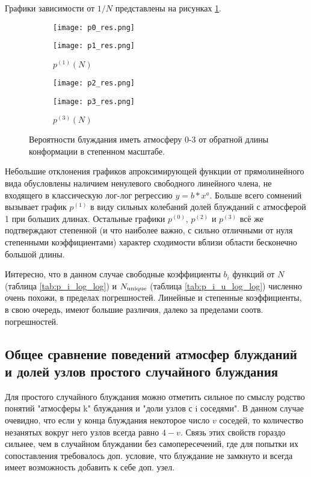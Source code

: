 Графики зависимости от $1/N$ представлены на рисунках \ref{fig:p_03_loglog}.

\begin{figure}[h]
\centering
\begin{subfigure}{0.495\textwidth}
\texttt{[image: p0\_res.png]}
\caption{$p^{(0)}(N)$}
\texttt{[image: p1\_res.png]}
\caption{$p^{(1)}(N)$}
\end{subfigure}
\hfill
\begin{subfigure}{0.495\textwidth}
\centering
\texttt{[image: p2\_res.png]}
\caption{$p^{(2)}(N)$}
\texttt{[image: p3\_res.png]}
\caption{$p^{(3)}(N)$}
\end{subfigure}
\caption{Вероятности блуждания иметь атмосферу 0-3 от обратной длины конформации в степенном масштабе.}
\label{fig:p_03_loglog}
\end{figure}

Небольшие отклонения графиков апроксимирующей функции от прямолинейного вида обусловлены наличием ненулевого свободного линейного члена,
не входящего в классическую лог-лог регрессию $y = b * x^a$.
Больше всего сомнений вызывает график $p^{(1)}$ в виду сильных колебаний долей блужданий с атмосферой 1 при больших длинах.
Остальные графики $p^{(0)}$, $p^{(2)}$ и $p^{(3)}$ всё же подтверждают степенной (и что наиболее важно, с сильно отличными от нуля степенными коэффициентами) характер сходимости вблизи области бесконечно большой длины.

Интересно, что в данном случае свободные коэффициенты $b_i$ функций от $N$ (таблица \ref{tab:p_i_log_log}) и $N_{\textup{unique}}$ (таблица \ref{tab:p_i_u_log_log}) численно очень похожи, в пределах погрешностей. Линейные и степенные коэффициенты, в свою очередь, имеют большие различия, далеко за пределами соотв. погрешностей.

\newpage

\subsection{Общее сравнение поведений атмосфер блужданий и долей узлов простого случайного блуждания}

Для простого случайного блуждания можно отметить сильное по смыслу родство понятий "атмосферы k" блуждания и "доли узлов с i соседями". 
В данном случае очевидно, что если у конца блуждания некоторое число $v$ соседей, то количество незанятых вокруг него узлов всегда равно $4-v$. 
Связь этих свойств гораздо сильнее, чем в случайном блуждании без самопересечений, где для попытки их сопоставления требовалось доп. условие, что блуждание не замкнуто и всегда имеет возможность добавить к себе доп. узел.

